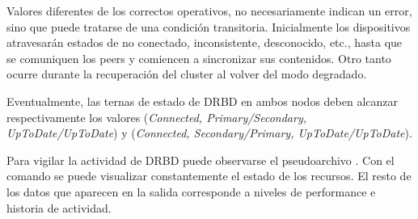 Valores diferentes de los correctos operativos, no necesariamente indican un error, sino que puede tratarse de una condición transitoria. Inicialmente los dispositivos atravesarán estados de no conectado, inconsistente, desconocido, etc., hasta que se comuniquen los peers y comiencen a sincronizar sus contenidos. Otro tanto ocurre durante la recuperación del cluster al volver del modo degradado. 

Eventualmente, las ternas de estado de DRBD en ambos nodos deben alcanzar respectivamente los valores (\textit{Connected, Primary/Secondary, UpToDate/UpToDate}) y (\textit{Connected, Secondary/Primary, UpToDate/UpToDate}).


Para vigilar la actividad de DRBD puede observarse el pseudoarchivo . Con el comando  se puede visualizar constantemente el estado de los recursos. El resto de los datos que aparecen en la salida corresponde a niveles de performance e historia de actividad. 


